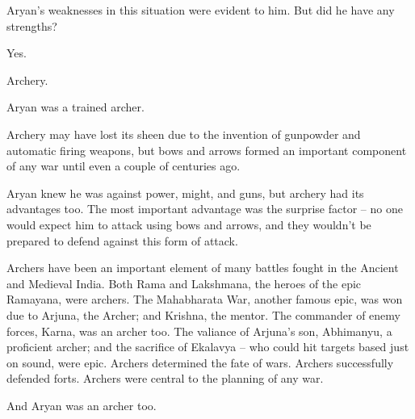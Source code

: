 Aryan's weaknesses in this situation were evident to him. But did he have any
strengths?

Yes.

Archery.

Aryan was a trained archer.

Archery may have lost its sheen due to the invention of gunpowder and automatic
firing weapons, but bows and arrows formed an important component of any war
until even a couple of centuries ago.

Aryan knew he was against power, might, and guns, but archery had its advantages
too. The most important advantage was the surprise factor – no one would expect
him to attack using bows and arrows, and they wouldn't be prepared to defend
against this form of attack.

Archers have been an important element of many battles fought in the Ancient and
Medieval India. Both Rama and Lakshmana, the heroes of the epic Ramayana, were
archers. The Mahabharata War, another famous epic, was won due to Arjuna, the
Archer; and Krishna, the mentor. The commander of enemy forces, Karna, was an
archer too. The valiance of Arjuna's son, Abhimanyu, a proficient archer; and
the sacrifice of Ekalavya – who could hit targets based just on sound, were
epic. Archers determined the fate of wars. Archers successfully defended forts.
Archers were central to the planning of any war.

And Aryan was an archer too.